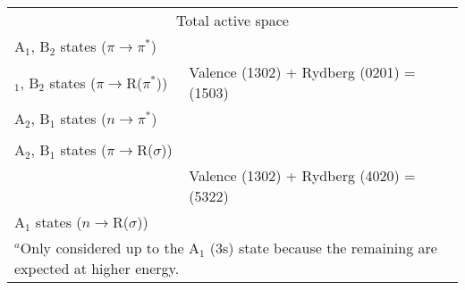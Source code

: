 \begin{table}[p]
\begin{center}
\begin{tabular}{ll}
\\
\multicolumn{2}{c}{Total active space}\\
A$_1$, B$_2$ states ($\pi\to\pi^*$)\\
$_1$, B$_2$ states ($\pi\to$R($\pi^*$)) & Valence (1302) + Rydberg (0201) = (1503)\\
A$_2$, B$_1$ states ($n\to\pi^*$)\\
\\
A$_2$, B$_1$ states ($\pi\to$R($\sigma$))\\[-0.08in]
                                    & Valence (1302) + Rydberg (4020) = (5322)\\[-0.08in]
A$_1$ states ($n\to$R($\sigma$))\\
\hline
\multicolumn{2}{l}{\footnotesize{$^a$Only considered up to the A$_1$ (3s) state because the remaining are expected at higher energy.}}\\
\end{tabular}
\end{center}
\end{table}
%


